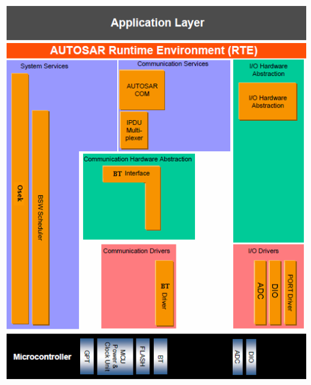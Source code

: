 \documentclass[a4paper,11pt]{scrreprt}
\begin{document}
\includegraphics{Komponenten.png}
\end{document}
